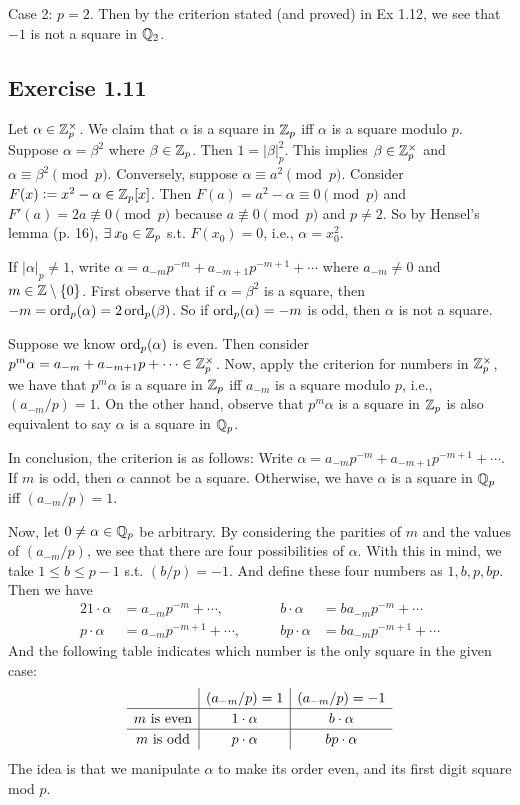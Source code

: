 \documentclass[../Koblitz.tex]{subfiles}
\begin{document}
Case 2: $p=2$. Then by the criterion stated (and proved) in Ex 1.12, we see that $-1$ is not a square in $\mathbb{Q}_2$.

\subsection*{Exercise 1.11}

Let $\alpha\in\mathbb{Z}_p^\times$. We claim that $\alpha$ is a square in $\mathbb{Z}_p$ iff $\alpha$ is a square modulo $p$. Suppose $\alpha=\beta^2$ where $\beta\in\mathbb{Z}_p$. Then $1=|\beta|_p^2$. This implies $\beta\in\mathbb{Z}_p^\times$ and $\alpha\equiv \beta^2 \pmod{p}$. Conversely, suppose $\alpha\equiv a^2 \pmod{p}$. Consider $F(x):=x^2-\alpha\in\mathbb{Z}_p[x]$. Then $F(a)=a^2-\alpha\equiv0\pmod{p}$ and $F'(a)=2a\not\equiv0 \pmod{p}$ because $a\not\equiv0\pmod{p}$ and $p\neq2$. So by Hensel's lemma (p. 16), $\exists x_0\in\ZZ_p$ s.t. $F(x_0)=0$, i.e., $\alpha=x_0^2$.

If $|\alpha|_p\neq1$, write $\alpha=a_{-m}p^{-m}+a_{-m+1}p^{-m+1}+\cdots$ where $a_{-m}\neq0$ and $m\in\mathbb{Z}\setminus\{0\}$. First observe that if $\alpha=\beta^2$ is a square, then $-m=\operatorname{ord}_p(\alpha)=2\operatorname{ord}_p(\beta)$. So if $\operatorname{ord}_p(\alpha)=-m$ is odd, then $\alpha$ is not a square.

Suppose we know $\operatorname{ord}_p(\alpha)$ is even. Then consider $p^m\alpha = a_{-m}+a_{-m+1}p+\cdots\in\mathbb{Z}_p^\times$. Now, apply the criterion for numbers in $\mathbb{Z}_p^\times$, we have that $p^m\alpha$ is a square in $\mathbb{Z}_p$ iff $a_{-m}$ is a square modulo $p$, i.e., $(a_{-m}/p)=1$. On the other hand, observe that $p^m\alpha$ is a square in $\mathbb{Z}_p$ is also equivalent to say $\alpha$ is a square in $\mathbb{Q}_p$.

In conclusion, the criterion is as follows: Write $\alpha=a_{-m}p^{-m}+a_{-m+1}p^{-m+1}+\cdots$. If $m$ is odd, then $\alpha$ cannot be a square. Otherwise, we have $\alpha$ is a square in $\mathbb{Q}_p$ iff $(a_{-m}/p)=1$.

Now, let $0\neq\alpha\in\mathbb{Q}_p$ be arbitrary. By considering the parities of $m$ and the values of $(a_{-m}/p)$, we see that there are four possibilities of $\alpha$. With this in mind, we take $1\leq b\leq p-1$ s.t. $(b/p)=-1$. And define these four numbers as $1,b,p,bp$. Then we have
\begin{alignat*}{2}
1\cdot\alpha &= a_{-m}p^{-m}+\cdots, &\qquad b\cdot\alpha &= ba_{-m}p^{-m}+\cdots \\
p\cdot\alpha &= a_{-m}p^{-m+1}+\cdots, &\qquad bp\cdot\alpha &= ba_{-m}p^{-m+1}+\cdots
\end{alignat*}
And the following table indicates which number is the only square in the given case:
$$
\def\arraystretch{1.2}
\begin{array}{c|c|c}
 & (a_{-m}/p)=1 & (a_{-m}/p)=-1 \\
\hline
m \text{ is even} & 1\cdot\alpha & b\cdot\alpha \\
\hline
m \text{ is odd} & p\cdot\alpha & bp\cdot\alpha
\end{array}
$$
The idea is that we manipulate $\alpha$ to make its order even, and its first digit square mod $p$.
\end{document}
